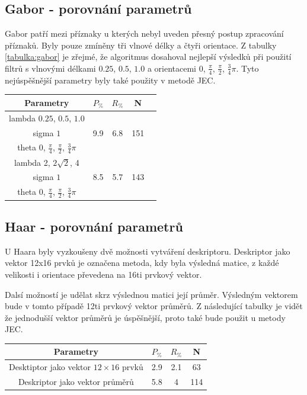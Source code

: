 \documentclass[czech,BP]{thesiskiv}
\begin{document}
\subsection{Gabor - porovnání parametrů}
Gabor patří mezi příznaky u kterých nebyl uveden přesný postup zpracování příznaků. Byly pouze zmíněny tři vlnové délky a čtyři orientace. Z tabulky \ref{tabulka:gabor} je zřejmé, že algoritmus dosahoval nejlepší výsledků při použití filtrů s vlnovými délkami $0.25$, $0.5$, $1.0$ a orientacemi $0$, $\frac{\pi}{4}$, $\frac{\pi}{2}$, $\frac{3}{4}\pi$. Tyto nejúspěšnější parametry byly také použity v metodě JEC.
\begin{center}
\begin{tabular}{ |c|c|c|c|c| }
\hline
Parametry & $P_{\%}$ & $R_{\%}$ & N \\ \hline
 lambda $0.25$, $0.5$, $1.0$ & \multirow{3}{*}{9.9} & \multirow{3}{*}{6.8} & \multirow{3}{*}{151} \\
 sigma $1$ & & & \\
 theta $0$, $\frac{\pi}{4}$, $\frac{\pi}{2}$, $\frac{3}{4}\pi$ & & & \\ \hline
 lambda 2, $2\sqrt{2}$, 4 & \multirow{3}{*}{8.5} & \multirow{3}{*}{5.7} & \multirow{3}{*}{143} \\
 sigma $1$ & & & \\
 theta $0$, $\frac{\pi}{4}$, $\frac{\pi}{2}$, $\frac{3}{4}\pi$ & & & \\ 
\hline
\end{tabular}
\label{tabulka:gabor}
\end{center}

\subsection{Haar - porovnání parametrů}
U Haara byly vyzkoušeny dvě možnosti vytváření deskriptoru. Deskriptor jako vektor 12x16 prvků je označena metoda, kdy byla výsledná matice, z každé velikosti i orientace převedena na 16ti prvkový vektor. 
\par Dalsí možností je udělat skrz výslednou matici její průměr. Výsledným vektorem bude v tomto případě 12ti prvkový vektor průměrů. Z následující tabulky je vidět že jednodušší vektor průměrů je úspěšnější, proto také bude použit u metody JEC.
\begin{center}
	\begin{tabular}{ |c|c|c|c| }
		\hline
		Parametry & $P_{\%}$  & $R_{\%}$ & N \\ \hline
		Desktiptor jako vektor $12 \times 16$ prvků & 2.9 & 2.1 & 63 \\ \hline
		Deskriptor jako vektor průměrů & 5.8 & 4 & 114 \\ \hline 	
	\end{tabular}
\end{center}
\end{document}
